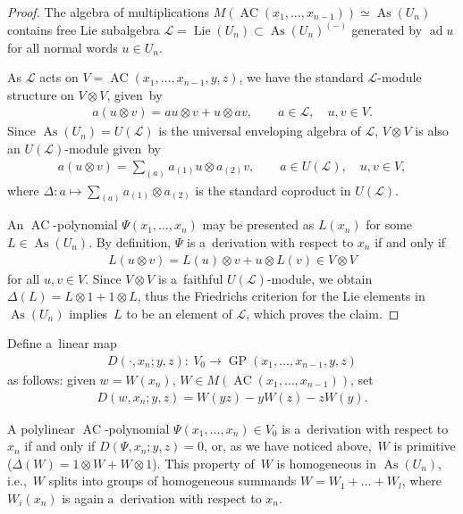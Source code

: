 \documentclass[11pt]{article}
\DeclareMathOperator{\ad}{ad}
\begin{document}
\begin{proof}
The algebra of multiplications $M(\operatorname{AC}(x_1,\dots, x_{n-1}))\simeq \operatorname{As}(U_n)$ contains free Lie subalgebra $\mathcal L =
\operatorname{Lie}(U_n)\subset \operatorname{As}(U_n)^{(-)}$ generated by $\ad u$ for all normal words $u\in U_n$.

As $\mathcal L$ acts on $V=\operatorname{AC}(x_1,\dots, x_{n-1}, y,z)$, we have the standard $\mathcal L$-module structure on $V\otimes
V$, given~by
\begin{gather*}
a(u\otimes v) = au\otimes v + u\otimes av,
\qquad
a\in \mathcal L,
\quad
u,v\in V.
\end{gather*}
Since $\operatorname{As}(U_n)=U(\mathcal L)$ is the universal enveloping algebra of $\mathcal L$, $V\otimes V $ is also an $U(\mathcal
L)$-module given~by
\begin{gather*}
a(u\otimes v) = \sum\limits_{(a)} a_{(1)}u\otimes a_{(2)}v,
\qquad
a\in U(\mathcal L),
\quad
u,v\in V,
\end{gather*}
where $\Delta:a\mapsto \sum\limits_{(a)} a_{(1)}\otimes a_{(2)}$ is the standard coproduct in $U(\mathcal L)$.

An $\operatorname{AC}$-polynomial $\Psi (x_1,\dots, x_n)$ may be presented as $L(x_n)$ for some $L\in \operatorname{As}(U_n)$.
By def\/inition, $\Psi $ is a~derivation with respect to $x_n$ if and only if
\begin{gather*}
L(u\otimes v) = L(u)\otimes v + u\otimes L(v) \in V\otimes V
\end{gather*}
for all $u,v\in V$.
Since $V\otimes V$ is a~faithful $U(\mathcal L)$-module, we obtain $\Delta (L) = L\otimes 1 + 1\otimes L$, thus the
Friedrichs criterion for the Lie elements in $\operatorname{As}(U_n)$ implies~$L$ to be an element of $\mathcal L$, which proves the
claim.
\end{proof}

Def\/ine a~linear map
\begin{gather*}
D(\cdot, x_n; y,z): \ V_0 \to \operatorname{GP}(x_1,\dots, x_{n-1}, y,z)
\end{gather*}
as follows: given $w=W(x_n)$, $W\in M(\operatorname{AC}(x_1,\dots, x_{n-1}))$, set
\begin{gather*}
D(w, x_n; y,z) = W(yz) - yW(z) - zW(y).
\end{gather*}

A polylinear $\operatorname{AC}$-polynomial $\Psi (x_1,\dots, x_n)\in V_0$ is a~derivation with respect to $x_n$ if and only if $D(\Psi,
x_n; y,z)=0$, or, as we have noticed above,~$W$ is primitive ($\Delta (W) = 1\otimes W + W\otimes 1$).
This property of~$W$ is homogeneous in $\operatorname{As}(U_n)$, i.e.,~$W$ splits into groups of homogeneous summands $W=W_1+\dots+W_l$,
where $W_i(x_n)$ is again a~derivation with respect to $x_n$.
\end{document}
